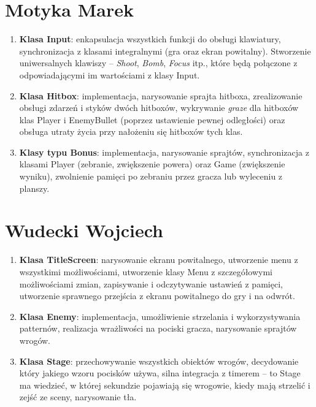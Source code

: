 \documentclass[a4paper,twoside]{article}
\begin{document}
	\section{Motyka Marek}
	\begin{enumerate}[label=\alph*.]
		\item \textbf{Klasa Input}: enkapsulacja wszystkich funkcji do obsługi klawiatury, synchronizacja z klasami integralnymi (gra oraz ekran powitalny). Stworzenie uniwersalnych klawiszy – \emph{Shoot}, \emph{Bomb}, \emph{Focus} itp., które będą połączone z odpowiadającymi im wartościami z klasy Input.
		\item \textbf{Klasa Hitbox}: implementacja, narysowanie sprajta hitboxa, zrealizowanie obsługi zdarzeń i styków dwóch hitboxów, wykrywanie \textit{graze} dla hitboxów klas Player i EnemyBullet (poprzez ustawienie pewnej odległości) oraz obsługa utraty życia przy nałożeniu się hitboxów tych klas.
		\item \textbf{Klasy typu Bonus}: implementacja, narysowanie sprajtów, synchronizacja z klasami Player (zebranie, zwiększenie powera) oraz Game (zwiększenie wyniku), zwolnienie pamięci po zebraniu przez gracza lub wyleceniu z planszy.
	\end{enumerate}
	
	\section{Wudecki Wojciech}
	\begin{enumerate}[label=\alph*.]
		\item \textbf{Klasa TitleScreen}: narysowanie ekranu powitalnego, utworzenie menu z wszystkimi możliwościami, utworzenie klasy Menu z szczegółowymi możliwościami zmian, zapisywanie i odczytywanie ustawień z pamięci, utworzenie sprawnego przejścia z ekranu powitalnego do gry i na odwrót.
		\item \textbf{Klasa Enemy}: implementacja, umożliwienie strzelania i wykorzystywania patternów, realizacja wrażliwości na pociski gracza, narysowanie sprajtów wrogów.
		\item \textbf{Klasa Stage}: przechowywanie wszystkich obiektów wrogów, decydowanie który jakiego wzoru pocisków używa, silna integracja z timerem – to Stage ma wiedzieć, w której sekundzie pojawiają się wrogowie, kiedy mają strzelić i zejść ze sceny, narysowanie tła.
		
	\end{enumerate}
	
	
	
\end{document}
